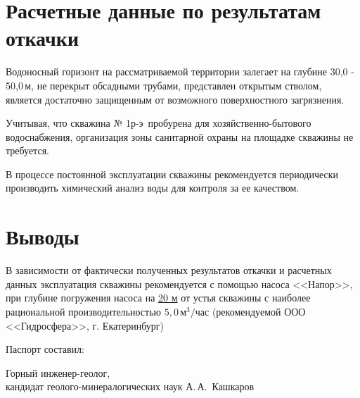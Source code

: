 \documentclass[a4paper,12pt]{article} %
\newcommand{\txtExecutor}{ООО <<Гидросфера>>}			%
\newcommand{\txtNumber}{№ 1р-э}  					%
\newcommand{\txtPump}{<<Напор>>}  					%
\newcommand{\txtDepth}{50,0}						%
\newcommand{\txtDebit}{5,0}							%
\begin{document}
\section*{Расчетные данные по результатам откачки}

Водоносный горизонт на рассматриваемой территории залегает на глубине 	30,0 - \txtDepth	\,м, не перекрыт обсадными трубами, представлен открытым стволом, является достаточно защищенным от возможного поверхностного загрязнения.

Учитывая, что скважина \txtNumber \, пробурена для хозяйственно-бытового водоснабжения, организация зоны санитарной охраны на площадке скважины не требуется.

В процессе постоянной эксплуатации скважины рекомендуется периодически производить химический анализ воды для контроля за ее качеством.

\section*{Выводы}

В зависимости от фактически полученных результатов откачки и расчетных данных эксплуатация скважины рекомендуется с помощью насоса  \txtPump, при глубине погружения насоса  на \underline{20 м} от устья скважины с наиболее рациональной производительностью 	$\txtDebit \,м^3/час$ (рекомендуемой \txtExecutor, г. Екатеринбург)

\bigskip

Паспорт составил:

\bigskip

\begin{minipage}{1.0\textwidth}
	Горный инженер-геолог,\\
	кандидат геолого-минералогических наук 
	А.\,А.~Кашкаров
\end{minipage}
\end{document}
